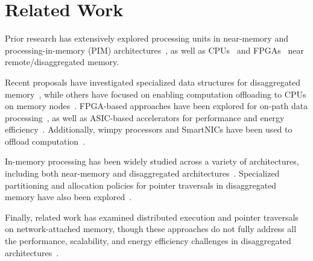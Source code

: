 \section{Related Work}
Prior research has extensively explored processing units in near-memory and processing-in-memory (PIM) architectures~\cite{ahn2015scalable, asghari2016chameleon, dai2018graphh, schuiki2018scalable, mutlu2019processing, lockerman2020livia, tu2022redcim, devic2022_PIM, wang2022_Nearstream, xie2023mpu, mutlu2022modern, oliveira2022accelerating, eckert2022eidetic, chi2016prime, seshadri2017simple, kwon2019_TensorDIMM, boroumand2019_codna, cho2020_data, ke2020_RecNMP, wang2021stream, xie2021spacea, ke2021near, singh2021fpga, olgun2022pidram, dai2022dimmining, gu2020ipim, gomez2023evaluating, walkers, impica}, as well as CPUs~\cite{storagefunctions, splinter, aifm, kayak_nsdi_21, storm_systor_19, zhang2022_teleport} and FPGAs~\cite{clio, strom} near remote/disaggregated memory.

Recent proposals have investigated specialized data structures for disaggregated memory~\cite{sherman, clover, fusee, rolex, marlin, sephash, ditto}, while others have focused on enabling computation offloading to CPUs on memory nodes~\cite{aifm, kayak_nsdi_21, splinter, storagefunctions, storm_systor_19}. FPGA-based approaches have been explored for on-path data processing~\cite{clio, strom}, as well as ASIC-based accelerators for performance and energy efficiency~\cite{impica, walkers}. Additionally, wimpy processors and SmartNICs have been used to offload computation~\cite{rmc_hotnets20, redn}.

In-memory processing has been widely studied across a variety of architectures, including both near-memory and disaggregated architectures~\cite{ahn2015scalable, impica, asghari2016chameleon, chi2016prime, seshadri2017simple, dai2018graphh, schuiki2018scalable, mutlu2019processing, kwon2019_TensorDIMM, boroumand2019_codna, gu2020ipim, lockerman2020livia, cho2020_data, ke2020_RecNMP, wang2021stream, xie2021spacea, ke2021near, singh2021fpga, olgun2022pidram, mutlu2022modern, oliveira2022accelerating, eckert2022eidetic, tu2022redcim, dai2022dimmining, devic2022_PIM, wang2022_Nearstream, gomez2023evaluating, xie2023mpu}. Specialized partitioning and allocation policies for pointer traversals in disaggregated memory have also been explored~\cite{sherman, clover, fusee, rolex, marlin, sephash, ditto}.

Finally, related work has examined distributed execution and pointer traversals on network-attached memory, though these approaches do not fully address all the performance, scalability, and energy efficiency challenges in disaggregated architectures~\cite{storagefunctions, splinter, aifm, kayak_nsdi_21, walkers, clio, strom, sun2023demystifying}.


